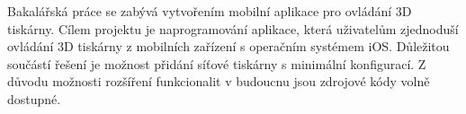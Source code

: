 Bakalářská práce se zabývá vytvořením mobilní aplikace pro ovládání 3D tiskárny.
Cílem projektu je naprogramování aplikace, která uživatelům zjednoduší ovládání 3D tiskárny z mobilních zařízení s operačním systémem iOS.
Důležitou součástí řešení je možnost přidání síťové tiskárny s minimální konfigurací.
Z důvodu možnosti rozšíření funkcionalit v budoucnu jsou zdrojové kódy volně dostupné.

